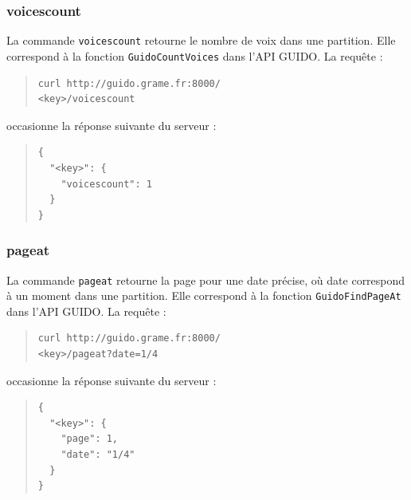 \documentclass{article}
\newcommand{\guidosize}{7pt}
\begin{document}
\subsubsection{voicescount}
La commande \verb=voicescount= retourne le nombre de voix dans une partition. Elle correspond à la fonction \verb=GuidoCountVoices= dans l'API GUIDO. La requête :
\begin{quote}
\begingroup
\fontsize{\guidosize}{12pt}\selectfont
\begin{verbatim}
curl http://guido.grame.fr:8000/
<key>/voicescount
\end{verbatim}
\endgroup
\end{quote}
occasionne la réponse suivante du serveur :
\begin{quote}
\begingroup
\fontsize{\guidosize}{12pt}\selectfont
\begin{verbatim}
{
  "<key>": {
    "voicescount": 1
  }
}
\end{verbatim}
\endgroup
\end{quote}
\subsubsection{pageat}
La commande \verb=pageat= retourne la page pour une date précise, où \og{}date\fg{} correspond à un moment dans une partition. Elle correspond à la fonction \verb=GuidoFindPageAt= dans l'API GUIDO. La requête :
\begin{quote}
\begingroup
\fontsize{\guidosize}{12pt}\selectfont
\begin{verbatim}
curl http://guido.grame.fr:8000/
<key>/pageat?date=1/4
\end{verbatim}
\endgroup
\end{quote}
occasionne la réponse suivante du serveur :
\begin{quote}
\begingroup
\fontsize{\guidosize}{12pt}\selectfont
\begin{verbatim}
{
  "<key>": {
    "page": 1,
    "date": "1/4"
  }
}
\end{verbatim}
\endgroup
\end{quote}
\end{document}

